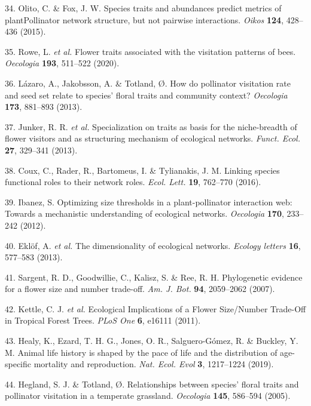 \documentclass[12pt,a4paper,]{article}
\begin{document}
\hypertarget{ref-olito2015}{}
34. Olito, C. \& Fox, J. W. Species traits and abundances predict
metrics of plantPollinator network structure, but not pairwise
interactions. \emph{Oikos} \textbf{124}, 428--436 (2015).

\hypertarget{ref-rowe2020}{}
35. Rowe, L. \emph{et al.} Flower traits associated with the visitation
patterns of bees. \emph{Oecologia} \textbf{193}, 511--522 (2020).

\hypertarget{ref-lazaro2013}{}
36. Lázaro, A., Jakobsson, A. \& Totland, Ø. How do pollinator
visitation rate and seed set relate to species' floral traits and
community context? \emph{Oecologia} \textbf{173}, 881--893 (2013).

\hypertarget{ref-junker2013}{}
37. Junker, R. R. \emph{et al.} Specialization on traits as basis for
the niche-breadth of flower visitors and as structuring mechanism of
ecological networks. \emph{Funct. Ecol.} \textbf{27}, 329--341 (2013).

\hypertarget{ref-coux2016}{}
38. Coux, C., Rader, R., Bartomeus, I. \& Tylianakis, J. M. Linking
species functional roles to their network roles. \emph{Ecol. Lett.}
\textbf{19}, 762--770 (2016).

\hypertarget{ref-ibanez2012}{}
39. Ibanez, S. Optimizing size thresholds in a plant-pollinator
interaction web: Towards a mechanistic understanding of ecological
networks. \emph{Oecologia} \textbf{170}, 233--242 (2012).

\hypertarget{ref-eklof2013}{}
40. Eklöf, A. \emph{et al.} The dimensionality of ecological networks.
\emph{Ecology letters} \textbf{16}, 577--583 (2013).

\hypertarget{ref-sargent2007}{}
41. Sargent, R. D., Goodwillie, C., Kalisz, S. \& Ree, R. H.
Phylogenetic evidence for a flower size and number trade-off. \emph{Am.
J. Bot.} \textbf{94}, 2059--2062 (2007).

\hypertarget{ref-kettle2011}{}
42. Kettle, C. J. \emph{et al.} Ecological Implications of a Flower
Size/Number Trade-Off in Tropical Forest Trees. \emph{PLoS One}
\textbf{6}, e16111 (2011).

\hypertarget{ref-healy2019}{}
43. Healy, K., Ezard, T. H. G., Jones, O. R., Salguero-Gómez, R. \&
Buckley, Y. M. Animal life history is shaped by the pace of life and the
distribution of age-specific mortality and reproduction. \emph{Nat.
Ecol. Evol} \textbf{3}, 1217--1224 (2019).

\hypertarget{ref-hegland2005}{}
44. Hegland, S. J. \& Totland, Ø. Relationships between species' floral
traits and pollinator visitation in a temperate grassland.
\emph{Oecologia} \textbf{145}, 586--594 (2005).
\end{document}
